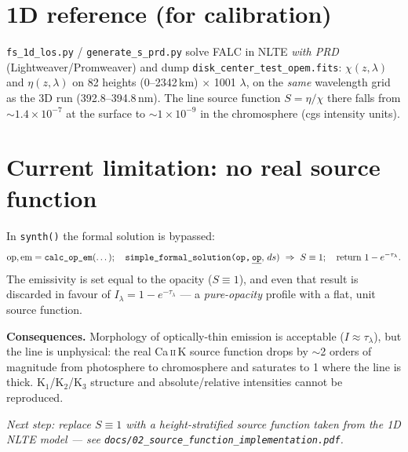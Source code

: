 \documentclass[10pt]{article}
\newcommand{\code}[1]{\texttt{\small #1}}
\begin{document}
\section{1D reference (for calibration)}
\code{fs\_1d\_los.py} / \code{generate\_s\_prd.py} solve FALC in NLTE \emph{with PRD}
(Lightweaver/Promweaver) and dump \code{disk\_center\_test\_opem.fits}:
$\chi(z,\lambda)$ and $\eta(z,\lambda)$ on 82 heights (0--2342\,km) $\times$ 1001
$\lambda$, on the \emph{same} wavelength grid as the 3D run (392.8--394.8\,nm).
The line source function $S=\eta/\chi$ there falls from $\sim$$1.4\times10^{-7}$ at
the surface to $\sim$$1\times10^{-9}$ in the chromosphere (cgs intensity units).

\section{Current limitation: no real source function}
In \code{synth()} the formal solution is bypassed:
\[
  \text{op},\text{em}=\texttt{calc\_op\_em}(\dots);\quad
  \texttt{simple\_formal\_solution(op,\,\underline{op}},\,ds)\ \Rightarrow\ S\equiv1;\quad
  \text{return } 1-e^{-\tau_\lambda}.
\]
The emissivity is set equal to the opacity ($S\equiv1$), and even that result is
discarded in favour of $I_\lambda = 1-e^{-\tau_\lambda}$ --- a \emph{pure-opacity}
profile with a flat, unit source function.

\textbf{Consequences.} Morphology of optically-thin emission is acceptable
($I\approx\tau_\lambda$), but the line is unphysical: the real Ca\,\textsc{ii}\,K
source function drops by $\sim$2 orders of magnitude from photosphere to
chromosphere and saturates to 1 where the line is thick. K$_1$/K$_2$/K$_3$
structure and absolute/relative intensities cannot be reproduced.

\begin{center}\small\itshape
Next step: replace $S\equiv1$ with a height-stratified source function taken from
the 1D NLTE model --- see \code{docs/02\_source\_function\_implementation.pdf}.
\end{center}
\end{document}

